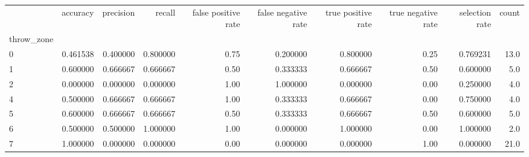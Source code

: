 \begin{tabular}{lrrrrrrrrr}
\toprule
{} &  accuracy &  precision &    recall &  false positive rate &  false negative rate &  true positive rate &  true negative rate &  selection rate &  count \\
throw\_zone &           &            &           &                      &                      &                     &                     &                 &        \\
\midrule
0          &  0.461538 &   0.400000 &  0.800000 &                 0.75 &             0.200000 &            0.800000 &                0.25 &        0.769231 &   13.0 \\
1          &  0.600000 &   0.666667 &  0.666667 &                 0.50 &             0.333333 &            0.666667 &                0.50 &        0.600000 &    5.0 \\
2          &  0.000000 &   0.000000 &  0.000000 &                 1.00 &             1.000000 &            0.000000 &                0.00 &        0.250000 &    4.0 \\
4          &  0.500000 &   0.666667 &  0.666667 &                 1.00 &             0.333333 &            0.666667 &                0.00 &        0.750000 &    4.0 \\
5          &  0.600000 &   0.666667 &  0.666667 &                 0.50 &             0.333333 &            0.666667 &                0.50 &        0.600000 &    5.0 \\
6          &  0.500000 &   0.500000 &  1.000000 &                 1.00 &             0.000000 &            1.000000 &                0.00 &        1.000000 &    2.0 \\
7          &  1.000000 &   0.000000 &  0.000000 &                 0.00 &             0.000000 &            0.000000 &                1.00 &        0.000000 &   21.0 \\
\bottomrule
\end{tabular}
